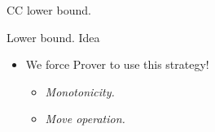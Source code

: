 \begin{frame}{CC lower bound.}
    
\end{frame}


\begin{frame}{Lower bound. Idea}

    \begin{center}
                
    \end{center}


    \pause
    \pause
    \pause
    \pause
    \pause
    \pause
    \pause
    \pause
    \begin{itemize}
        \item We force Prover to use this strategy!
            \pause
            \begin{itemize}
                \item \emph{Monotonicity.}
                    \pause
                \item \emph{Move operation.}
            \end{itemize}
    \end{itemize}



\end{frame}

